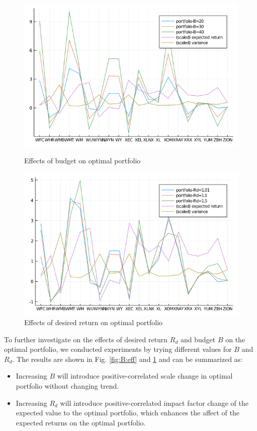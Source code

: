 \documentclass[12pt]{ftec2101}
\begin{document}
\begin{figure}[htbp]
    \centering
    \begin{minipage}{0.45\textwidth}
        \centering
        \includegraphics[scale=0.3]{5-exp-B.png}
        \caption{{\small Effects of budget on optimal portfolio}}
        \label{fig:B:eff}
    \end{minipage}\hfill
    \begin{minipage}{0.45\textwidth}
        \centering
        \includegraphics[scale=0.3]{5-exp-Rd.png}
        \caption{{\small Effects of desired return on optimal portfolio}}
        \label{fig:rd:eff}
    \end{minipage}
\end{figure}
To further investigate on the effects of desired return $R_d$ and budget $B$ on the optimal portfolio, we conducted experiments by trying different values for $B$ and $R_d$. The results are shown in Fig. \ref{fig:B:eff} and \ref{fig:rd:eff} and can be summarized as:
\begin{itemize}
    \item Increasing $B$ will introduce positive-correlated scale change in optimal portfolio without changing trend.
    \item Increasing $R_d$ will introduce positive-correlated impact factor change of the expected value to the optimal portfolio, which enhances the affect of the expected returns on the optimal portfolio.
\end{itemize}
\end{document}
